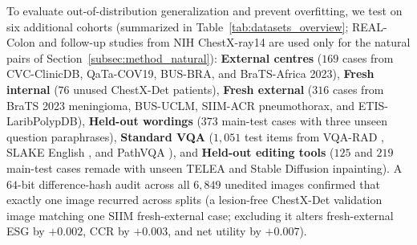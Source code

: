 \documentclass[5p,times,twocolumn,authoryear]{elsarticle}
\begin{document}
To evaluate out-of-distribution generalization and prevent overfitting, we test on six additional cohorts (summarized in Table~\ref{tab:datasets_overview}; REAL-Colon and follow-up studies from NIH ChestX-ray14 are used only for the natural pairs of Section~\ref{subsec:method_natural}): \textbf{External centres} ($169$ cases from CVC-ClinicDB, QaTa-COV19, BUS-BRA, and BraTS-Africa 2023), \textbf{Fresh internal} ($76$ unused ChestX-Det patients), \textbf{Fresh external} ($316$ cases from BraTS 2023 meningioma, BUS-UCLM, SIIM-ACR pneumothorax, and ETIS-LaribPolypDB), \textbf{Held-out wordings} ($373$ main-test cases with three unseen question paraphrases), \textbf{Standard VQA} ($1,051$ test items from VQA-RAD \citep{lau2018vqarad}, SLAKE English \citep{liu2021slake}, and PathVQA \citep{he2020pathvqa}), and \textbf{Held-out editing tools} ($125$ and $219$ main-test cases remade with unseen TELEA \citep{telea2004image} and Stable Diffusion \citep{rombach2022high} inpainting). A $64$-bit difference-hash audit across all $6,849$ unedited images confirmed that exactly one image recurred across splits (a lesion-free ChestX-Det validation image matching one SIIM fresh-external case; excluding it alters fresh-external ESG by $+0.002$, CCR by $+0.003$, and net utility by $+0.007$).
\end{document}
